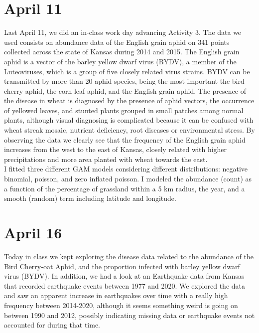 \documentclass[
]{book}
\begin{document}
\hypertarget{april-11}{%
\section{April 11}\label{april-11}}

Last April 11, we did an in-class work day advancing Activity 3. The data we used consists on abundance data of the English grain aphid on 341 points collected across the state of Kansas during 2014 and 2015. The English grain aphid is a vector of the barley yellow dwarf virus (BYDV), a member of the Luteoviruses, which is a group of five closely related virus strains. BYDV can be transmitted by more than 20 aphid species, being the most important the bird-cherry aphid, the corn leaf aphid, and the English grain aphid. The presence of the disease in wheat is diagnosed by the presence of aphid vectors, the occurrence of yellowed leaves, and stunted plants grouped in small patches among normal plants, although visual diagnosing is complicated because it can be confused with wheat streak mosaic, nutrient deficiency, root diseases or environmental stress. By observing the data we clearly see that the frequency of the English grain aphid increases from the west to the east of Kansas, closely related with higher precipitations and more area planted with wheat towards the east.\\
I fitted three different GAM models considering different distributions: negative binomial, poisson, and zero inflated poisson. I modeled the abundance (count) as a function of the percentage of grassland within a 5 km radius, the year, and a smooth (random) term including latitude and longitude.

\hypertarget{april-16}{%
\section{April 16}\label{april-16}}

Today in class we kept exploring the disease data related to the abundance of the Bird Cherry-oat Aphid, and the proportion infected with barley yellow dwarf virus (BYDV). In addition, we had a look at an Earthquake data from Kansas that recorded earthquake events between 1977 and 2020. We explored the data and saw an apparent increase in earthquakes over time with a really high frequency between 2014-2020, although it seems something weird is going on between 1990 and 2012, possibly indicating missing data or earthquake events not accounted for during that time.
\end{document}
